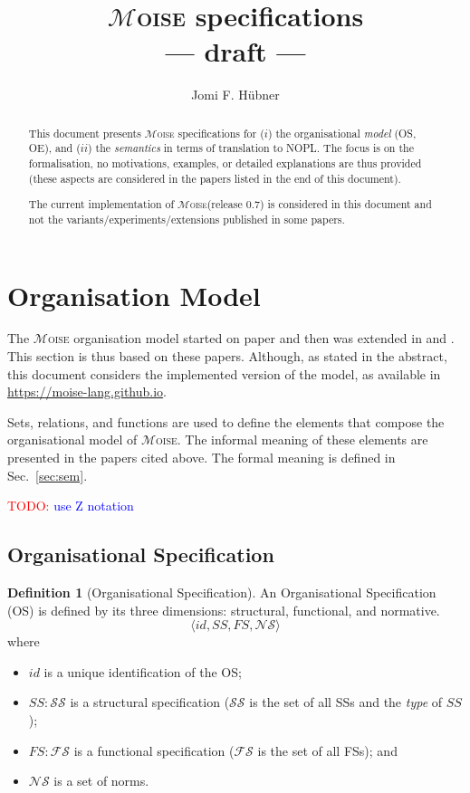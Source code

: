 \documentclass{article}
\newcommand{\moise}{{$\mathcal{M}$\textsc{oise}}\xspace}
\newcommand{\todo}[1]{\textcolor{red}{TODO: }\textcolor{blue}{#1}}
\newcommand{\set}[1]{\mathcal{#1}}
\theoremstyle{definition} \newtheorem{definition}{Definition}
\begin{document}
\title{\moise specifications \\ --- draft ---}
\author{Jomi F. H\"ubner}
\maketitle

\begin{abstract}
  This document presents \moise specifications for ($i$) the
  organisational \emph{model} (OS, OE), and ($ii$) the
  \emph{semantics} in terms of translation to NOPL. The focus is on
  the formalisation, no motivations, examples, or detailed
  explanations are thus provided (these aspects are considered in the
  papers listed in the end of this document).

  The current implementation of \moise (release 0.7) is considered in
  this document and not the variants/experiments/extensions
  published in some papers.
\end{abstract}


\newpage
\tableofcontents
\newpage


\section{Organisation Model}

The \moise organisation model started on paper \cite{hannoun:02} and
then was extended in \cite{hubner:02b} and \cite{gateau:eumas05}. This
section is thus based on these papers. Although, as stated in the
abstract, this document considers the implemented version of the
model, as available in \url{https://moise-lang.github.io}.

Sets, relations, and functions are used to define the elements that
compose the organisational model of \moise. The informal meaning of
these elements are presented in the papers cited above. The formal
meaning is defined in Sec.~\ref{sec:sem}.

\todo{use Z notation}

\subsection{Organisational Specification}


\begin{definition}[Organisational Specification]
  An Organisational Specification (OS) is defined by its three
  dimensions: structural, functional, and normative.
  \begin{displaymath}
    \langle id, SS, FS, \set{NS} \rangle
  \end{displaymath}
  where
  \begin{itemize}
  \item $id$ is a unique identification of the OS;
  \item $SS : \set{SS}$ is a structural specification ($\set{SS}$ is
    the set of all SSs and the \emph{type} of $SS$);
  \item $FS : \set{FS}$ is a functional specification ($\set{FS}$ is
    the set of all FSs); and
  \item $\set{NS}$ is a set of norms.
  \end{itemize}
\end{definition}
\end{document}
